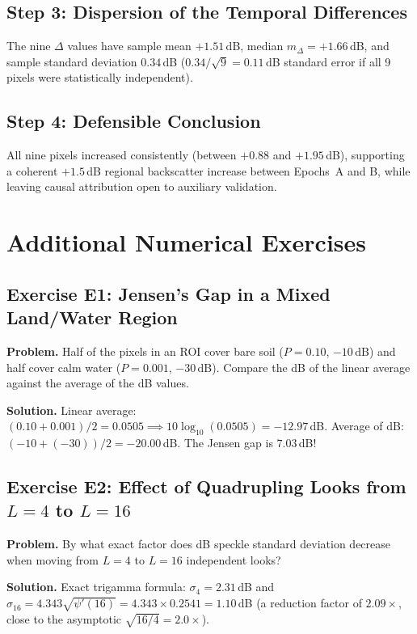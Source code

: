 \documentclass[11pt,a4paper]{article}
\begin{document}
\subsection{Step 3: Dispersion of the Temporal Differences}

The nine $\Delta$ values have sample mean $+1.51$\,dB, median $m_\Delta = +1.66$\,dB, and sample standard deviation $0.34$\,dB ($0.34/\sqrt9=0.11$\,dB standard error if all 9 pixels were statistically independent).

\subsection{Step 4: Defensible Conclusion}

All nine pixels increased consistently (between $+0.88$ and $+1.95$\,dB), supporting a coherent $+1.5$\,dB regional backscatter increase between Epochs~A and B, while leaving causal attribution open to auxiliary validation.

\section{Additional Numerical Exercises}
\label{sec:ej-extra}

\subsection*{Exercise E1: Jensen's Gap in a Mixed Land/Water Region}
\textbf{Problem.} Half of the pixels in an ROI cover bare soil ($P=0.10$, $-10$\,dB) and half cover calm water ($P=0.001$, $-30$\,dB). Compare the dB of the linear average against the average of the dB values.

\textbf{Solution.} Linear average: $(0.10+0.001)/2=0.0505 \implies 10\log_{10}(0.0505)=-12.97$\,dB. Average of dB: $(-10 + (-30))/2 = -20.00$\,dB. The Jensen gap is $7.03$\,dB!

\subsection*{Exercise E2: Effect of Quadrupling Looks from $L=4$ to $L=16$}
\textbf{Problem.} By what exact factor does dB speckle standard deviation decrease when moving from $L=4$ to $L=16$ independent looks?

\textbf{Solution.} Exact trigamma formula: $\sigma_4=2.31$\,dB and $\sigma_{16}=4.343\sqrt{\psi'(16)}=4.343\times 0.2541=1.10$\,dB (a reduction factor of $2.09\times$, close to the asymptotic $\sqrt{16/4}=2.0\times$).
\end{document}
